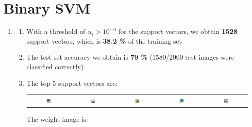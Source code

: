 \documentclass[12pt]{article}
\begin{document}
\clearpage

\section{Binary SVM}

\begin{enumerate}[label=(\alph*)]
    \item \begin{enumerate}[label=\roman*.]
        \item With a threshold of $\alpha_i > 10^{-6}$ for the support vectors, we obtain \textbf{1528} support vectors, which is \textbf{38.2 \%} of the training set
        \item The test set accuracy we obtain is \textbf{79 \%} (1580/2000 test images were classified correctly)
        \item The top 5 support vectors are:

        \begin{center}
        \begin{tabular}{c c c c c}
            \includegraphics[width=0.1\textwidth]{../Q2/Qa/sv_1.png} &
            \includegraphics[width=0.1\textwidth]{../Q2/Qa/sv_2.png} &
            \includegraphics[width=0.1\textwidth]{../Q2/Qa/sv_3.png} &
            \includegraphics[width=0.1\textwidth]{../Q2/Qa/sv_4.png} &
            \includegraphics[width=0.1\textwidth]{../Q2/Qa/sv_5.png} 
        \end{tabular}
        \end{center}

        The weight image is:


\end{enumerate}
\end{enumerate}
\end{document}
